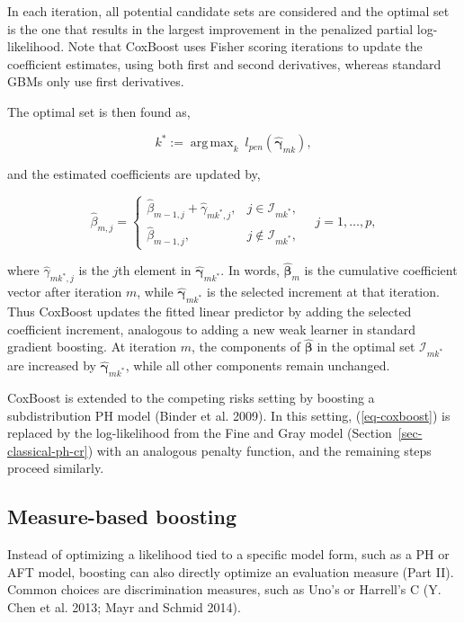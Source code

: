 \documentclass[
  letterpaper,
  krantz2]{style/krantz}
\begin{document}
In each iteration, all potential candidate sets are considered and the
optimal set is the one that results in the largest improvement in the
penalized partial log-likelihood. Note that CoxBoost uses Fisher scoring
iterations to update the coefficient estimates, using both first and
second derivatives, whereas standard GBMs only use first derivatives.

The optimal set is then found as,

\[
k^* := \mathop{\mathrm{arg\,max}}_k \ l_{pen}(\hat{\boldsymbol{\gamma}}_{mk}),
\]

and the estimated coefficients are updated by,

\[
\hat{\beta}_{m, j} =
\begin{cases}
\hat{\beta}_{m-1, j} + \hat{\gamma}_{mk^*,j}, & j \in \mathcal{I}_{mk^*}, \\
\hat{\beta}_{m-1, j}, & j \notin \mathcal{I}_{mk^*},
\end{cases}
\quad j = 1, \ldots, p,
\]

where \(\hat{\gamma}_{mk^*,j}\) is the \(j\)th element in
\(\hat{\boldsymbol{\gamma}}_{mk^*}\). In words,
\(\hat{\boldsymbol{\beta}}_m\) is the cumulative coefficient vector
after iteration \(m\), while \(\hat{\boldsymbol{\gamma}}_{mk^*}\) is the
selected increment at that iteration. Thus CoxBoost updates the fitted
linear predictor by adding the selected coefficient increment, analogous
to adding a new weak learner in standard gradient boosting. At iteration
\(m\), the components of \(\hat{\boldsymbol{\beta}}\) in the optimal set
\(\mathcal{I}_{mk^*}\) are increased by
\(\hat{\boldsymbol{\gamma}}_{mk^*}\), while all other components remain
unchanged.

CoxBoost is extended to the competing risks setting by boosting a
subdistribution PH model (Binder et al. 2009). In this setting,
(\ref{eq-coxboost}) is replaced by the log-likelihood from the Fine and
Gray model (Section~\ref{sec-classical-ph-cr}) with an analogous penalty
function, and the remaining steps proceed
similarly.

\subsection{Measure-based boosting}\label{sec-boost-loss}

Instead of optimizing a likelihood tied to a specific model form, such
as a PH or AFT model, boosting can also directly optimize an evaluation
measure (Part
II). Common
choices are discrimination measures, such as Uno's or Harrell's C (Y.
Chen et al. 2013; Mayr and Schmid 2014).
\end{document}
